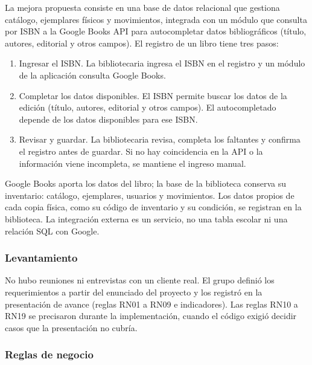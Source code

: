 \documentclass[11pt,a4paper]{article}
\begin{document}
La mejora propuesta consiste en una base de datos relacional que gestiona catálogo, ejemplares físicos y movimientos, integrada con un módulo que consulta por ISBN a la Google Books API para autocompletar datos bibliográficos (título, autores, editorial y otros campos). El registro de un libro tiene tres pasos:
\begin{enumerate}[nosep]
\item Ingresar el ISBN. La bibliotecaria ingresa el ISBN en el registro y un módulo de la aplicación consulta Google Books.
\item Completar los datos disponibles. El ISBN permite buscar los datos de la edición (título, autores, editorial y otros campos). El autocompletado depende de los datos disponibles para ese ISBN.
\item Revisar y guardar. La bibliotecaria revisa, completa los faltantes y confirma el registro antes de guardar. Si no hay coincidencia en la API o la información viene incompleta, se mantiene el ingreso manual.
\end{enumerate}

Google Books aporta los datos del libro; la base de la biblioteca conserva su inventario: catálogo, ejemplares, usuarios y movimientos. Los datos propios de cada copia física, como su código de inventario y su condición, se registran en la biblioteca. La integración externa es un servicio, no una tabla escolar ni una relación SQL con Google.

\subsubsection{Levantamiento}
No hubo reuniones ni entrevistas con un cliente real. El grupo definió los requerimientos a partir del enunciado del proyecto y los registró en la presentación de avance (reglas RN01 a RN09 e indicadores). Las reglas RN10 a RN19 se precisaron durante la implementación, cuando el código exigió decidir casos que la presentación no cubría.

\subsubsection{Reglas de negocio}
\end{document}
